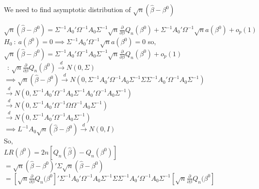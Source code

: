\documentclass[11pt]{article}
\theoremstyle{definition}
\newcommand*\circled[1]{\tikz[baseline=(char.base)]{
            \node[shape=circle,draw,inner sep=2pt] (char) {#1};}}
\def\indist{\stackrel{d}{\rightarrow}}
\def\Ho{$H_{0} \ : \ a(\beta^{0})=0$}
\begin{document}
We need to find asymptotic distribution of $\sqrt{n}(\hat{\beta}-\beta^{0})$

$\sqrt{n}(\hat{\beta}-\beta^{0})=\Sigma^{-1}A_{0}'\Omega^{-1}A_{0}\Sigma^{-1}\sqrt{n}\frac{\partial}{\partial \beta}Q_{n}(\beta^{0})+\Sigma^{-1}A_{0}'\Omega^{-1}\sqrt{n}a(\beta^{0})+o_{p}(1)$ \\

\Ho$\implies \Sigma^{-1}A_{0}'\Omega^{-1}\sqrt{n}a(\beta^{0})=0$ so, \\

$\sqrt{n}(\hat{\beta}-\beta^{0})=\Sigma^{-1}A_{0}'\Omega^{-1}A_{0}\Sigma^{-1}\sqrt{n}\frac{\partial}{\partial \beta}Q_{n}(\beta^{0})+o_{p}(1)$ \\

\circled{B} \ : $ \sqrt{n}\frac{\partial}{\partial \beta}Q_{n}(\beta^{0}) \indist N(0,\Sigma)$ \\

$\implies \sqrt{n}(\hat{\beta}-\beta^{0}) \indist N\left(0,\Sigma^{-1}A_{0}'\Omega^{-1}A_{0}\Sigma^{-1}\Sigma\Sigma^{-1}A_{0}'\Omega^{-1}A_{0}\Sigma^{-1}\right)$ \\

\hspace{30mm}$ \indist N\left(0,\Sigma^{-1}A_{0}'\Omega^{-1}A_{0}\Sigma^{-1}A_{0}'\Omega^{-1}A_{0}\Sigma^{-1}\right)$ \\

\hspace{30mm}$ \indist N\left(0,\Sigma^{-1}A_{0}'\Omega^{-1}\Omega\Omega^{-1}A_{0}\Sigma^{-1}\right)$ \\

\hspace{30mm}$ \indist N\left(0,\Sigma^{-1}A_{0}'\Omega^{-1}A_{0}\Sigma^{-1}\right)$ \\

$\implies L^{-1}A_{0}\sqrt{n}(\hat{\beta}-\beta^{0}) \indist N(0,I)$ \\

So, \\

$LR(\beta^{0})=2n\left[Q_{n}(\hat{\beta})-Q_{n}(\beta^{0})\right]$ \\

$=\sqrt{n}(\hat{\beta}-\beta^{0})'\Sigma\sqrt{n}(\hat{\beta}-\beta^{0})$ \\

$=\left[\sqrt{n}\frac{\partial}{\partial \beta}Q_{n}(\beta^{0}\right]'\Sigma^{-1}A_{0}'\Omega^{-1}A_{0}\Sigma^{-1}\Sigma\Sigma^{-1}A_{0}'\Omega^{-1}A_{0}\Sigma^{-1}\left[\sqrt{n}\frac{\partial}{\partial \beta}Q_{n}(\beta^{0}\right]$ \\
\end{document}
